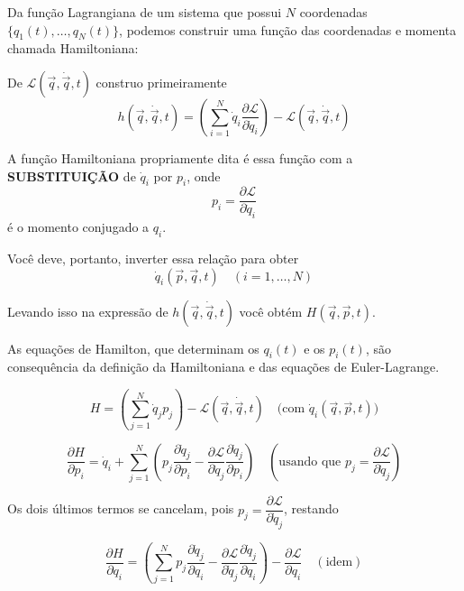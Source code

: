 Da função Lagrangiana de um sistema que possui $N$ coordenadas $\{q_1(t), \dots, q_N(t)\}$, podemos construir uma função das coordenadas e momenta chamada Hamiltoniana:

De $\mathcal{L}(\vec{q}, \dot{\vec{q}}, t)$ construo primeiramente
\begin{equation}
    h(\vec{q}, \dot{\vec{q}}, t) = \left( \sum_{i=1}^{N} \dot{q}_i \frac{\partial \mathcal{L}}{\partial \dot{q}_i} \right) - \mathcal{L}(\vec{q}, \dot{\vec{q}}, t)
\label{eq:aula9_h_qdotq}
\end{equation}

A função Hamiltoniana propriamente dita é essa função com a \textbf{SUBSTITUIÇÃO} de $\dot{q}_i$ por $p_i$, onde
\begin{equation}
    p_i = \frac{\partial \mathcal{L}}{\partial \dot{q}_i}
\label{eq:aula9_momento_conjugado}
\end{equation}
é o momento conjugado a $q_i$.

Você deve, portanto, inverter essa relação para obter
\begin{equation}
    \dot{q}_i(\vec{p}, \vec{q}, t) \quad (i = 1, \dots, N)
\label{eq:aula9_qdot_inv}
\end{equation}

Levando isso na expressão de $h(\vec{q}, \dot{\vec{q}}, t)$ você obtém $H(\vec{q}, \vec{p}, t)$.

As equações de Hamilton, que determinam os $q_i(t)$ e os $p_i(t)$, são consequência da definição da Hamiltoniana e das equações de Euler-Lagrange.

\begin{equation}
    H = \left( \sum_{j=1}^{N} \dot{q}_j p_j \right) - \mathcal{L}(\vec{q}, \dot{\vec{q}}, t) \quad \text{(com } \dot{q}_i(\vec{q}, \vec{p}, t) \text{)}
\label{eq:aula9_H_def}
\end{equation}

\begin{equation}
    \frac{\partial H}{\partial p_i} = \dot{q}_i + \sum_{j=1}^{N} \left( p_j \frac{\partial \dot{q}_j}{\partial p_i} - \frac{\partial \mathcal{L}}{\partial \dot{q}_j} \frac{\partial \dot{q}_j}{\partial p_i} \right) \quad \left( \text{usando que } p_j = \frac{\partial \mathcal{L}}{\partial \dot{q}_j} \right)
\label{eq:aula9_dHdp}
\end{equation}

Os dois últimos termos se cancelam, pois $p_j = \dfrac{\partial \mathcal{L}}{\partial \dot{q}_j}$, restando

\begin{equation}
    \frac{\partial H}{\partial q_i} = \left( \sum_{j=1}^{N} p_j \frac{\partial \dot{q}_j}{\partial q_i} - \frac{\partial \mathcal{L}}{\partial \dot{q}_j} \frac{\partial \dot{q}_j}{\partial q_i} \right) - \frac{\partial \mathcal{L}}{\partial q_i} \quad (\text{idem})
\label{eq:aula9_dHdq}
\end{equation}

